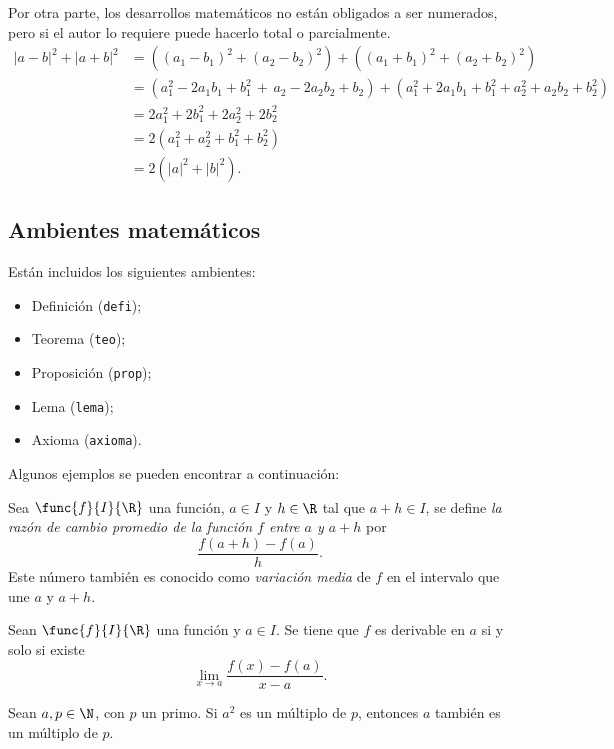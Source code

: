 \documentclass{aleph-revista}
\begin{document}
Por otra parte, los desarrollos matemáticos no están obligados a ser numerados, pero si el autor lo requiere puede hacerlo total o parcialmente.
\begin{align*}
    |a-b|^2+|a+b|^2 & = \left((a_1-b_1)^2+(a_2-b_2)^2\right)+ \left((a_1+b_1)^2+(a_2+b_2)^2\right) \\
        & = \left(a_1^2-2a_1b_1+b_1^2\, + \, a_2-2a_2b_2+b_2\right)+\left(a_1^2+2a_1b_1+b_1^2+a_2^2+a_2b_2+b_2^2\right)\\
        & = 2a_1^2+2b_1^2+2a_2^2+2b_2^2\\
        & = 2 (a_1^2+a_2^2+b_1^2+b_2^2)\\
        & = 2(|a|^2+|b|^2).
\end{align*}

\subsection{Ambientes matemáticos}
Están incluidos los siguientes ambientes:
\begin{itemize}
    \item Definición (\texttt{defi});
    \item Teorema (\texttt{teo});
    \item Proposición (\texttt{prop});
    \item Lema (\texttt{lema});
    \item Axioma (\texttt{axioma}).
\end{itemize}
Algunos ejemplos se pueden encontrar a continuación:

\begin{defi}
    Sea $\func{f}{I}{\R}$ una función, $a\in I$ y $h\in\R$ tal que $a+h\in I$, se define \emph{la razón de cambio promedio de la función $f$ entre $a$ y $a+h$} por
    \[
        \frac{f(a+h)-f(a)}{h}.
    \]
    Este número también es conocido como \emph{variación media} de $f$ en el intervalo que une $a$ y $a + h$.
\end{defi}

\begin{prop}
    Sean $\func{f}{I}{\R}$ una función y $a\in I$. Se tiene que $f$ es derivable en $a$ si y solo si existe
    \[
        \lim_{x\to a}\frac{f(x)-f(a)}{x-a}.
    \]
\end{prop}

\begin{lem}
    Sean $a,p\in\N$, con $p$ un primo. Si $a^2$ es un múltiplo de $p$, entonces $a$ también es un múltiplo de $p$.
\end{lem}
\end{document}
